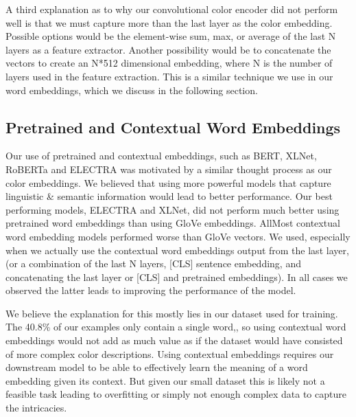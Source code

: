 \par
A third explanation as to why our convolutional color encoder did not perform well is that we must capture more than the last layer as the color embedding. Possible options would be the element-wise sum, max, or average of the last N layers as a feature extractor. Another possibility would be to concatenate the vectors to create an N*512 dimensional embedding, where N is the number of layers used in the feature extraction. This is a similar technique we use in our word embeddings, which we discuss in the following section.

\subsection{Pretrained and Contextual Word Embeddings}

Our use of pretrained and contextual embeddings, such as BERT, XLNet, RoBERTa and ELECTRA was motivated by a similar thought process as our color embeddings. We believed that using more powerful models that capture linguistic \& semantic information would lead to better performance. Our best performing models, ELECTRA and XLNet, did not perform much better using pretrained word embeddings than using GloVe embeddings. AllMost contextual word embedding models performed worse than GloVe vectors. We used, especially when we actually use the contextual word embeddings output from the last layer, (or a combination of the last N layers, [CLS] sentence embedding, and concatenating the last layer or [CLS] and pretrained embeddings). In all cases we observed the latter leads to improving the performance of the model.

\par
We believe the explanation for this mostly lies in our dataset used for training. The 40.8\% of our examples only contain a single  word,, so using contextual word embeddings would not add as much value as if the dataset would have consisted of more complex color descriptions. Using contextual embeddings requires our downstream  model to be able to effectively learn the meaning of a word embedding given its context. But given our small dataset this is likely not a feasible task leading to overfitting or simply not enough complex data to capture the intricacies.

